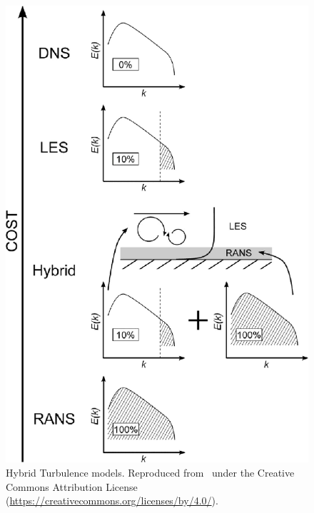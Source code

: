 \documentclass{ucb}
\begin{document}
\begin{figure}[h] \label{fig:HRLMS}
    \centering
    \includegraphics[]{img/TurbulenceModelsResolution_Tucker2015.jpg}
    \caption{Hybrid Turbulence models. Reproduced from~\cite{Tucker2015} under the Creative Commons Attribution License (\url{https://creativecommons.org/licenses/by/4.0/}).}
   
\end{figure}

\ucbbib{}
    
\end{document}
